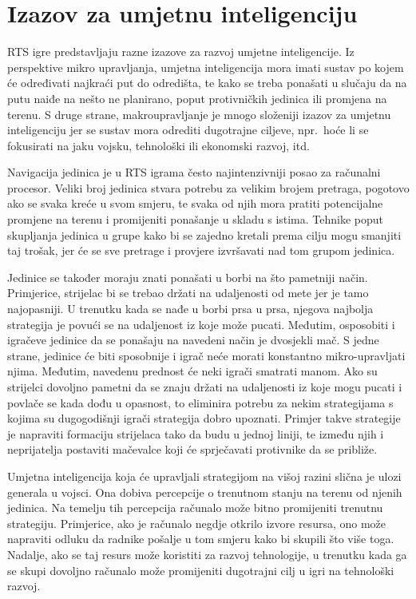\documentclass[times, utf8, zavrsni, numeric]{fer}
\begin{document}
\section{Izazov za umjetnu inteligenciju}

\par RTS igre predstavljaju razne izazove za razvoj umjetne inteligencije. 
Iz perspektive mikro upravljanja, umjetna inteligencija mora imati sustav po kojem će određivati najkraći put do odredišta, te kako se treba ponašati u slučaju da na putu naiđe na nešto ne planirano, poput protivničkih jedinica ili promjena na terenu. 
S druge strane, makroupravljanje je mnogo složeniji izazov za umjetnu inteligenciju jer se sustav mora odrediti dugotrajne ciljeve, npr.\ hoće li se fokusirati na jaku vojsku, tehnološki ili ekonomski razvoj, itd.

\par Navigacija jedinica je u RTS igrama često najintenzivniji posao za računalni procesor.
Veliki broj jedinica stvara potrebu za velikim brojem pretraga, pogotovo ako se svaka kreće u svom smjeru, te svaka od njih mora pratiti potencijalne promjene na terenu i promijeniti ponašanje u skladu s istima.
Tehnike poput skupljanja jedinica u grupe kako bi se zajedno kretali prema cilju mogu smanjiti taj trošak, jer će se sve pretrage i provjere izvršavati nad tom grupom jedinica\cite{book:AIGameProgrammingWisdom}.

\par Jedinice se također moraju znati ponašati u borbi na što pametniji način. Primjerice, strijelac bi se trebao držati na udaljenosti od mete jer je tamo najopasniji.
U trenutku kada se nađe u borbi prsa u prsa, njegova najbolja strategija je povući se na udaljenost iz koje može pucati.
Međutim, osposobiti i igračeve jedinice da se ponašaju na navedeni način  je dvosjekli mač.
S jedne strane, jedinice će biti sposobnije i igrač neće morati konstantno mikro-upravljati njima.
Međutim, navedenu prednost će neki igrači smatrati manom.
Ako su strijelci dovoljno pametni da se znaju držati na udaljenosti iz koje mogu pucati i povlače se kada dođu u opasnost, to eliminira potrebu za nekim strategijama s kojima su dugogodišnji igrači strategija dobro upoznati.
Primjer takve strategije je napraviti formaciju strijelaca tako da budu u jednoj liniji, te između njih i neprijatelja postaviti mačevalce koji će sprječavati protivnike da se približe.


\par Umjetna inteligencija koja će upravljali strategijom na višoj razini slična je ulozi generala u vojsci. 
Ona dobiva percepcije o trenutnom stanju na terenu od njenih jedinica.
Na temelju tih percepcija računalo može bitno promijeniti trenutnu strategiju. Primjerice, ako je računalo negdje otkrilo izvore resursa, ono može napraviti odluku da radnike pošalje u tom smjeru kako bi skupili što više toga.
Nadalje, ako se taj resurs može koristiti za razvoj tehnologije, u trenutku kada ga se skupi dovoljno računalo može promijeniti dugotrajni cilj u igri na tehnološki razvoj.
\end{document}
